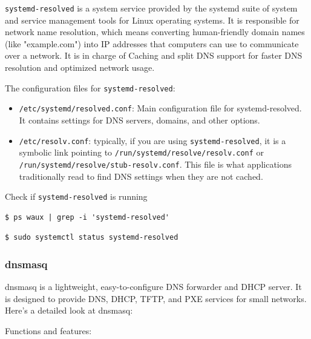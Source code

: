 \documentclass{article}
\newenvironment{codetemplate}[1][]{%
  \mybasecolorbox[#1]
  \itshape
}{%
  \endmybasecolorbox
}
\begin{document}
\verb+systemd-resolved+ is a system service provided by the systemd suite of system and service management tools for Linux operating systems. It is responsible for network name resolution, which means converting human-friendly domain names (like "example.com") into IP addresses that computers can use to communicate over a network. It is in charge of Caching and split DNS support for faster DNS resolution and optimized network usage.

The configuration files for \verb+systemd-resolved+:

\begin{itemize}
    \item \verb+/etc/systemd/resolved.conf+: Main configuration file for systemd-resolved. It contains settings for DNS servers, domains, and other options.
    \item \verb+/etc/resolv.conf+: typically, if you are using \verb+systemd-resolved+, it is a symbolic link pointing to    \verb+/run/systemd/resolve/resolv.conf+ or \verb+/run/systemd/resolve/stub-resolv.conf+. This file is what applications traditionally read to find DNS settings when they are not cached.
\end{itemize}

Check if \verb|systemd-resolved| is running
\begin{codetemplate}{}
\begin{verbatim}
$ ps waux | grep -i 'systemd-resolved'
\end{verbatim}
\end{codetemplate}
\begin{codetemplate}{}
\begin{verbatim}
$ sudo systemctl status systemd-resolved
\end{verbatim}
\end{codetemplate}

\subsubsection{dnsmasq}

dnsmasq is a lightweight, easy-to-configure DNS forwarder and DHCP server. It is designed to provide DNS, DHCP, TFTP, and PXE services for small networks. Here's a detailed look at dnsmasq:

Functions and features:
\end{document}
